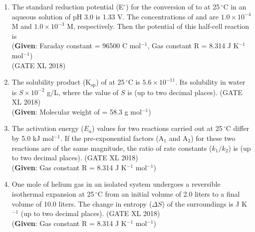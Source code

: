 \documentclass[14pt]{extarticle}
\begin{document}
\begin{flushleft}
\begin{enumerate}
\item The standard reduction potential (E$^\circ$) for the conversion of  to  at 25\,$^\circ$C in an aqueous solution of pH 3.0 is 1.33 V. The concentrations of  and  are $1.0 \times 10^{-4}$ M and $1.0 \times 10^{-3}$ M, respectively. Then the potential of this half-cell reaction is \\
(\textbf{Given}: Faraday constant = 96500 C mol$^{-1}$, Gas constant R = 8.314 J K$^{-1}$ mol$^{-1}$)\\
    \hfill (GATE XL 2018)\\
\begin{enumerate}[label=(\Alph*)]
\end{enumerate}

\item The solubility product (K$_\mathrm{sp}$) of  at 25\,$^\circ$C is $5.6 \times 10^{-11}$. Its solubility in water is $S \times 10^{-2}$ g/L, where the value of $S$ is \underline{\hspace{3cm}} (up to two decimal places). \hfill (GATE XL 2018)\\
(\textbf{Given}: Molecular weight of  = 58.3 g mol$^{-1}$)

\item The activation energy ($E_a$) values for two reactions carried out at 25\,$^\circ$C differ by 5.0 kJ mol$^{-1}$. If the pre-exponential factors (A$_1$ and A$_2$) for these two reactions are of the same magnitude, the ratio of rate constants ($k_1/k_2$) is \underline{\hspace{3cm}} (up to two decimal places). \hfill (GATE XL 2018)\\
(\textbf{Given}: Gas constant R = 8.314 J K$^{-1}$ mol$^{-1}$)

\item One mole of helium gas in an isolated system undergoes a reversible isothermal expansion at 25\,$^\circ$C from an initial volume of 2.0 liters to a final volume of 10.0 liters. The change in entropy ($\Delta S$) of the surroundings is \underline{\hspace{3cm}} J K$^{-1}$ (up to two decimal places). \hfill (GATE XL 2018)\\
(\textbf{Given}: Gas constant R = 8.314 J K$^{-1}$ mol$^{-1}$)


\end{enumerate}
\end{flushleft}
\end{document}
